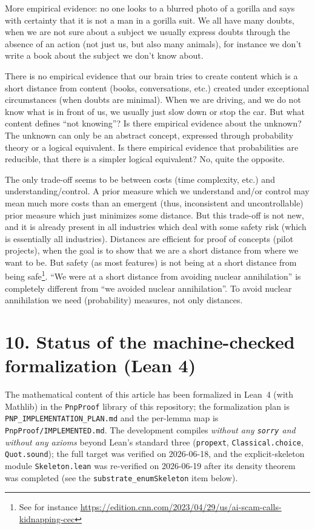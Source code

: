 \documentclass[11pt,a4paper]{report}
\begin{document}
More empirical evidence: no one looks to a blurred photo of a gorilla
and says with certainty that it is not a man in a gorilla suit. We all
have many doubts, when we are not sure about a subject we usually
express doubts through the absence of an action (not just us, but also
many animals), for instance we don't write a book about the subject we
don't know about.

There is no empirical evidence that our brain tries to create content
which is a short distance from content (books, conversations, etc.)
created under exceptional circumstances (when doubts are minimal). When
we are driving, and we do not know what is in front of us, we usually
just slow down or stop the car. But what content defines ``not
knowing''? Is there empirical evidence about the unknown? The unknown
can only be an abstract concept, expressed through probability theory or
a logical equivalent. Is there empirical evidence that probabilities are
reducible, that there is a simpler logical equivalent? No, quite the
opposite.

The only trade-off seems to be between costs (time complexity, etc.) and
understanding/control. A prior measure which we understand and/or
control may mean much more costs than an emergent (thus, inconsistent
and uncontrollable) prior measure which just minimizes some distance.
But this trade-off is not new, and it is already present in all
industries which deal with some safety risk (which is essentially all
industries). Distances are efficient for proof of concepts (pilot
projects), when the goal is to show that we are a short distance from
where we want to be. But safety (as most features) is not being at a
short distance from being safe\footnote{See for instance
  \href{https://edition.cnn.com/2023/04/29/us/ai-scam-calls-kidnapping-cec/index.html}{https://edition.cnn.com/2023/04/29/us/ai-scam-calls-kidnapping-cec}}.
``We were at a short distance from avoiding nuclear annihilation'' is
completely different from ``we avoided nuclear annihilation''. To avoid
nuclear annihilation we need (probability) measures, not only distances.

\hypertarget{status-of-the-machine-checked-formalization}{%
\section{10. Status of the machine-checked formalization (Lean
4)}\label{status-of-the-machine-checked-formalization}}

The mathematical content of this article has been formalized in Lean~4
(with Mathlib) in the \texttt{PnpProof} library of this repository; the
formalization plan is \texttt{PNP\_IMPLEMENTATION\_PLAN.md} and the
per-lemma map is \texttt{PnpProof/IMPLEMENTED.md}. The development
compiles \emph{without any \texttt{sorry} and without any axioms} beyond
Lean's standard three (\texttt{propext}, \texttt{Classical.choice},
\texttt{Quot.sound}); the full target was verified on 2026-06-18, and the
explicit-skeleton module \texttt{Skeleton.lean} was re-verified on 2026-06-19
after its density theorem was completed (see the \texttt{substrate\_enumSkeleton}
item below).
\end{document}
